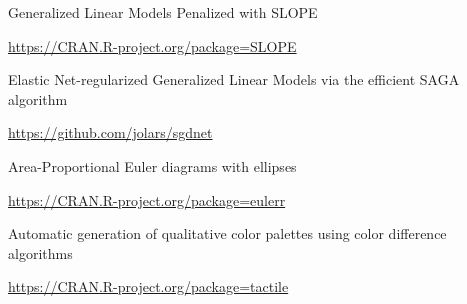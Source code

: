 \documentclass[
  10pt,
  headsepline=true,
  english,
  DIV=12
]{scrartcl}
\renewcommand*{%
  \mkbibnamegiven
}[1]{\ifitemannotation{highlight}{\textbf{#1}}{#1}}
\renewcommand*{%
  \mkbibnamefamily
}[1]{\ifitemannotation{highlight}{\textbf{#1}}{#1}}
\begin{document}
\begin{description}[
    labelwidth = \widthof{qualpalr} + 1em,
    leftmargin = \widthof{qualpalr} + 1em,
  ]
  \item[SLOPE] {
        Generalized Linear Models Penalized with SLOPE

        \url{https://CRAN.R-project.org/package=SLOPE}
        }
  \item[sgdnet] {
        Elastic Net-regularized Generalized Linear Models via the efficient
        SAGA algorithm

        \url{https://github.com/jolars/sgdnet}
        }
  \item[eulerr] {
        Area-Proportional Euler diagrams with ellipses

        \url{https://CRAN.R-project.org/package=eulerr}
        }
  \item[qualpalr] {
        Automatic generation of qualitative color palettes using color
        difference algorithms

        \url{https://CRAN.R-project.org/package=tactile}
        }

\end{description}
\end{document}
